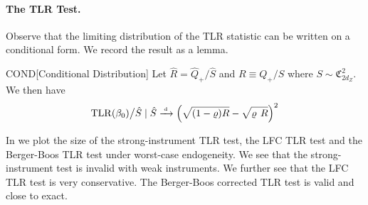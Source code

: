 \paragraph*{The TLR Test.}
Observe that the limiting distribution of the TLR statistic can be written on a conditional form. We record the result as a lemma.
\begin{lemmap}{COND}[Conditional Distribution]
    Let \(\hat R = \hat Q_+ / \hat S\) and \(R\equiv Q_+ / S\) where \(S\sim \mathfrak{C}^2_{2d_Z}\). We then have
    \begin{align}
        \mathrm{TLR}(\beta_0) \big / \hat S \mid \hat S \xrightarrow{{\scriptscriptstyle \mathrm{\;d\;}}} \left(\sqrt{(1-\varrho) R}-\sqrt{\varrho \phantom{)} R}\right)^2
    \end{align}
\end{lemmap}

\clearpage







In  we plot the size of the strong-instrument TLR test, the LFC TLR test and the Berger-Boos TLR test under worst-case endogeneity. We see that the strong-instrument test is invalid with weak instruments. We further see that the LFC TLR test is very conservative. The Berger-Boos corrected TLR test is valid and close to exact.

